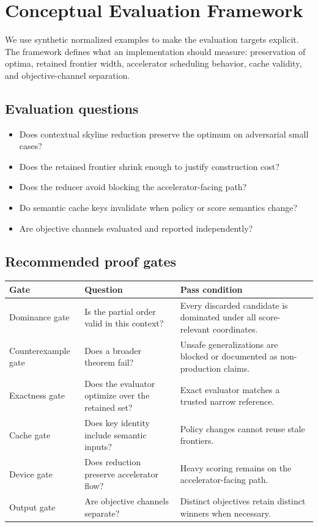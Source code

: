 \documentclass[11pt,oneside]{article}
\theoremstyle{definition}
\begin{document}
\section{Conceptual Evaluation Framework}

We use synthetic normalized examples to make the evaluation targets explicit. The framework defines what an implementation should measure: preservation of optima, retained frontier width, accelerator scheduling behavior, cache validity, and objective-channel separation.

\subsection{Evaluation questions}
\begin{itemize}
  \item Does contextual skyline reduction preserve the optimum on adversarial small cases?
  \item Does the retained frontier shrink enough to justify construction cost?
  \item Does the reducer avoid blocking the accelerator-facing path?
  \item Do semantic cache keys invalidate when policy or score semantics change?
  \item Are objective channels evaluated and reported independently?
\end{itemize}

\subsection{Recommended proof gates}
\begin{longtable}{>{\raggedright\arraybackslash}p{}>{\raggedright\arraybackslash}p{}>{\raggedright\arraybackslash}p{}}
\toprule
\textbf{Gate} & \textbf{Question} & \textbf{Pass condition} \\
\midrule
Dominance gate & Is the partial order valid in this context? & Every discarded candidate is dominated under all score-relevant coordinates. \\
Counterexample gate & Does a broader theorem fail? & Unsafe generalizations are blocked or documented as non-production claims. \\
Exactness gate & Does the evaluator optimize over the retained set? & Exact evaluator matches a trusted narrow reference. \\
Cache gate & Does key identity include semantic inputs? & Policy changes cannot reuse stale frontiers. \\
Device gate & Does reduction preserve accelerator flow? & Heavy scoring remains on the accelerator-facing path. \\
Output gate & Are objective channels separate? & Distinct objectives retain distinct winners when necessary. \\
\bottomrule
\end{longtable}
\end{document}

